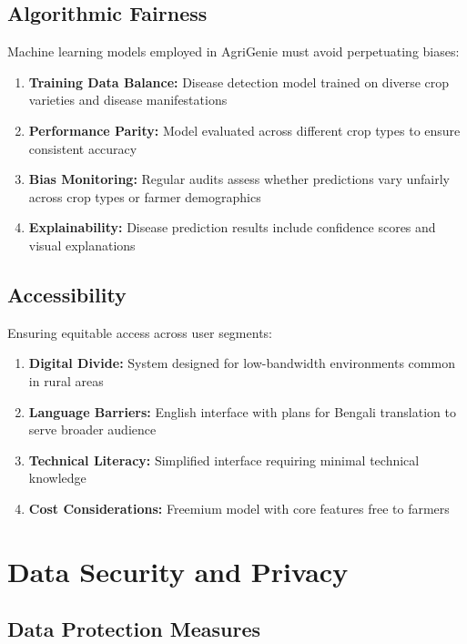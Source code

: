 \documentclass[12pt,a4paper]{report}
\begin{document}
\subsection{Algorithmic Fairness}

Machine learning models employed in AgriGenie must avoid perpetuating biases:

\begin{enumerate}
    \item \textbf{Training Data Balance:} Disease detection model trained on diverse crop varieties and disease manifestations
    \item \textbf{Performance Parity:} Model evaluated across different crop types to ensure consistent accuracy
    \item \textbf{Bias Monitoring:} Regular audits assess whether predictions vary unfairly across crop types or farmer demographics
    \item \textbf{Explainability:} Disease prediction results include confidence scores and visual explanations
\end{enumerate}

\subsection{Accessibility}

Ensuring equitable access across user segments:

\begin{enumerate}
    \item \textbf{Digital Divide:} System designed for low-bandwidth environments common in rural areas
    \item \textbf{Language Barriers:} English interface with plans for Bengali translation to serve broader audience
    \item \textbf{Technical Literacy:} Simplified interface requiring minimal technical knowledge
    \item \textbf{Cost Considerations:} Freemium model with core features free to farmers
\end{enumerate}

\section{Data Security and Privacy}

\subsection{Data Protection Measures}
\end{document}
